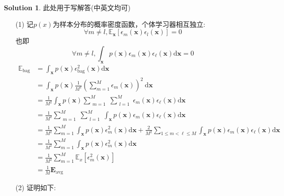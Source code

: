 \documentclass[a4paper,UTF8]{article}
\numberwithin{equation}{section}
\theoremstyle{definition}
\newtheorem*{solution}{Solution}
\begin{document}
\begin{solution}
	此处用于写解答(中英文均可)
	\begin{enumerate}
        \item [(1)]
        记$p(x)$为样本分布的概率密度函数，个体学习器相互独立: 
        $$\forall m \neq l, \mathbb{E}_{\boldsymbol{x}}\left[\epsilon_{m}(\boldsymbol{x}) \epsilon_{l}(\boldsymbol{x})\right]=0$$
        也即
        $$\forall m \neq l, \int_{\boldsymbol{x}} p(\boldsymbol{x}) \epsilon_{m}(\boldsymbol{x}) \epsilon_{\ell}(\boldsymbol{x}) \mathrm{d} \boldsymbol{x}=0$$
        \newpage
        \begin{equation}
            \begin{aligned} \mathbb{E}_{\mathrm{bag}}& =\int_{\boldsymbol{x}} p(\boldsymbol{x}) \epsilon_{\mathrm{bag}}^{2}(\boldsymbol{x}) \mathrm{d} \boldsymbol{x} \\
            &=\int_{\boldsymbol{x}} p(\boldsymbol{x}) \frac{1}{M^{2}}\left(\sum_{m=1}^{M} \epsilon_{m}(\boldsymbol{x})\right)^{2} \mathrm{~d} \boldsymbol{x} \\ &=\frac{1}{M^{2}} \int_{\boldsymbol{x}} p(\boldsymbol{x}) \sum_{\substack{m=1}}^{M} \sum_{\substack{l=1}}^{M}\epsilon_{m}(\boldsymbol{x}) \epsilon_{\ell}(\boldsymbol{x}) \mathrm{d} \boldsymbol{x} \\ &=\frac{1}{M^{2}} \sum_{\substack{m=1}}^{M}\sum_{\substack{l=1}}^{M} \int_{\boldsymbol{x}} p(\boldsymbol{x}) \epsilon_{m}(\boldsymbol{x}) \epsilon_{\ell}(\boldsymbol{x}) \mathrm{d} \boldsymbol{x} \\ &=\frac{1}{M^{2}} \sum_{m=1}^{M} \int_{\boldsymbol{x}} p(\boldsymbol{x}) \epsilon_{m}^{2}(\boldsymbol{x}) \mathrm{d} \boldsymbol{x}+\frac{2}{M^{2}} \sum_{1 \leq m<\ell \leq M} \int_{\boldsymbol{x}} p(\boldsymbol{x}) \epsilon_{m}(\boldsymbol{x}) \epsilon_{\ell}(\boldsymbol{x}) \mathrm{d} \boldsymbol{x} \\ &=\frac{1}{M^{2}} \sum_{m=1}^{M} \int_{\boldsymbol{x}} p(\boldsymbol{x}) \epsilon_{m}^{2}(\boldsymbol{x}) \mathrm{d} \boldsymbol{x} \\ &=\frac{1}{M^{2}} \sum_{m=1}^{M} \mathbb{E}_{x}\left[\epsilon_{m}^{2}(\boldsymbol{x})\right] \\ &=\frac{1}{M} \boldsymbol{E}_{\mathrm{avg}} \end{aligned} \nonumber
        \end{equation}
        \item [(2)]
        证明如下:
        \begin{equation}

\end{equation}
\end{enumerate}
\end{solution}
\end{document}
